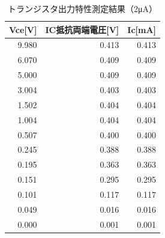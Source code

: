 \documentclass[titlepage]{jarticle}
\begin{document}
\begin{table}[htbp]
    \caption{トランジスタ出力特性測定結果（2μA）}
    \begin{center}
        \begin{tabular}{r|r|r}
            \hline\hline
            \multicolumn{1}{l|}{Vce[V]} & \multicolumn{1}{l|}{IC抵抗両端電圧[V]} & \multicolumn{1}{l}{Ic[mA]} \\ \hline
            9.980                       & 0.413                                  & 0.413                      \\ \hline
            6.070                       & 0.409                                  & 0.409                      \\ \hline
            5.000                       & 0.409                                  & 0.409                      \\ \hline
            3.004                       & 0.403                                  & 0.403                      \\ \hline
            1.502                       & 0.404                                  & 0.404                      \\ \hline
            1.004                       & 0.404                                  & 0.404                      \\ \hline
            0.507                       & 0.400                                  & 0.400                      \\ \hline
            0.245                       & 0.388                                  & 0.388                      \\ \hline
            0.195                       & 0.363                                  & 0.363                      \\ \hline
            0.151                       & 0.295                                  & 0.295                      \\ \hline
            0.101                       & 0.117                                  & 0.117                      \\ \hline
            0.049                       & 0.016                                  & 0.016                      \\ \hline
            0.000                       & 0.001                                  & 0.001                      \\ \hline
        \end{tabular}
    \end{center}
    \label{トランジスタ出力特性測定結果（2μA）}
\end{table}
\end{document}
